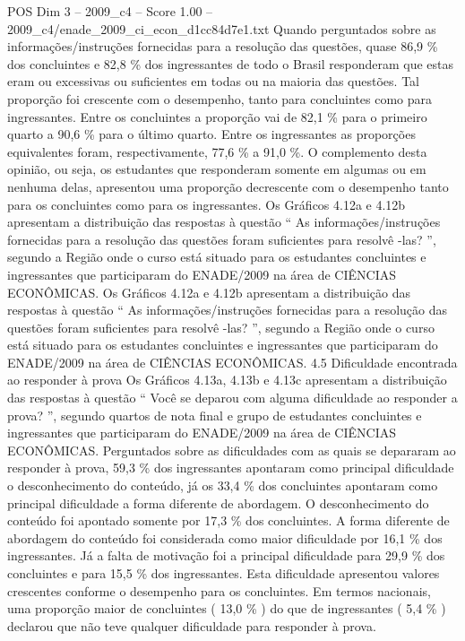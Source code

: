 \begin{textsample}{POS Dim 3 – 2009\_c4 – Score 1.00 – 2009\_c4/enade\_2009\_ci\_econ\_d1cc84d7e1.txt}
Quando perguntados sobre as informações/instruções fornecidas para a resolução das questões, quase 86,9 \% dos concluintes e 82,8 \% dos ingressantes de todo o Brasil responderam que estas eram ou excessivas ou suficientes em todas ou na maioria das questões.
Tal proporção foi crescente com o desempenho, tanto para concluintes como para ingressantes.
Entre os concluintes a proporção vai de 82,1 \% para o primeiro quarto a 90,6 \% para o último quarto.
Entre os ingressantes as proporções equivalentes foram, respectivamente, 77,6 \% a 91,0 \%.
O complemento desta opinião, ou seja, os estudantes que responderam somente em algumas ou em nenhuma delas, apresentou uma proporção decrescente com o desempenho tanto para os concluintes como para os ingressantes.
Os Gráficos 4.12a e 4.12b apresentam a distribuição das respostas à questão “ As informações/instruções fornecidas para a resolução das questões foram suficientes para resolvê -las? ”, segundo a Região onde o curso está situado para os estudantes concluintes e ingressantes que participaram do ENADE/2009 na área de CIÊNCIAS ECONÔMICAS.
Os Gráficos 4.12a e 4.12b apresentam a distribuição das respostas à questão “ As informações/instruções fornecidas para a resolução das questões foram suficientes para resolvê -las? ”, segundo a Região onde o curso está situado para os estudantes concluintes e ingressantes que participaram do ENADE/2009 na área de CIÊNCIAS ECONÔMICAS. 4.5 Dificuldade encontrada ao responder à prova Os Gráficos 4.13a, 4.13b e 4.13c apresentam a distribuição das respostas à questão “ Você se deparou com alguma dificuldade ao responder a prova? ”, segundo quartos de nota final e grupo de estudantes concluintes e ingressantes que participaram do ENADE/2009 na área de CIÊNCIAS ECONÔMICAS.
Perguntados sobre as dificuldades com as quais se depararam ao responder à prova, 59,3 \% dos ingressantes apontaram como principal dificuldade o desconhecimento do conteúdo, já os 33,4 \% dos concluintes apontaram como principal dificuldade a forma diferente de abordagem.
O desconhecimento do conteúdo foi apontado somente por 17,3 \% dos concluintes.
A forma diferente de abordagem do conteúdo foi considerada como maior dificuldade por 16,1 \% dos ingressantes.
Já a falta de motivação foi a principal dificuldade para 29,9 \% dos concluintes e para 15,5 \% dos ingressantes.
Esta dificuldade apresentou valores crescentes conforme o desempenho para os concluintes.
Em termos nacionais, uma proporção maior de concluintes ( 13,0 \% ) do que de ingressantes ( 5,4 \% ) declarou que não teve qualquer dificuldade para responder à prova.

\end{textsample}

